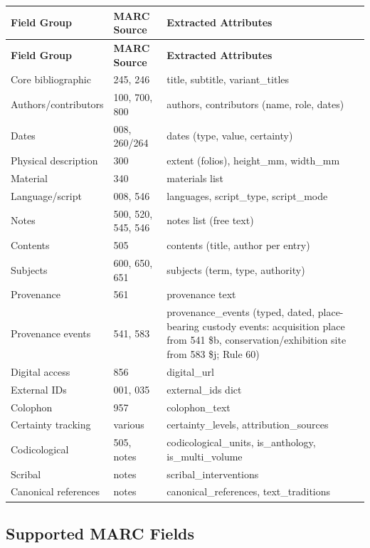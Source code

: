 \documentclass[12pt]{article}
\begin{document}
\begin{longtable}{|l|l|p{7cm}|}
\hline
\textbf{Field Group} & \textbf{MARC Source} & \textbf{Extracted Attributes} \\
\hline
\endfirsthead
\hline
\textbf{Field Group} & \textbf{MARC Source} & \textbf{Extracted Attributes} \\
\hline
\endhead
\hline
\endfoot
Core bibliographic & 245, 246 & title, subtitle, variant\_titles \\
\hline
Authors/contributors & 100, 700, 800 & authors, contributors (name, role, dates) \\
\hline
Dates & 008, 260/264 & dates (type, value, certainty) \\
\hline
Physical description & 300 & extent (folios), height\_mm, width\_mm \\
\hline
Material & 340 & materials list \\
\hline
Language/script & 008, 546 & languages, script\_type, script\_mode \\
\hline
Notes & 500, 520, 545, 546 & notes list (free text) \\
\hline
Contents & 505 & contents (title, author per entry) \\
\hline
Subjects & 600, 650, 651 & subjects (term, type, authority) \\
\hline
Provenance & 561 & provenance text \\
\hline
Provenance events & 541, 583 & provenance\_events (typed, dated, place-bearing custody events: acquisition place from 541 \$b, conservation/exhibition site from 583 \$j; Rule 60) \\
\hline
Digital access & 856 & digital\_url \\
\hline
External IDs & 001, 035 & external\_ids dict \\
\hline
Colophon & 957 & colophon\_text \\
\hline
Certainty tracking & various & certainty\_levels, attribution\_sources \\
\hline
Codicological & 505, notes & codicological\_units, is\_anthology, is\_multi\_volume \\
\hline
Scribal & notes & scribal\_interventions \\
\hline
Canonical references & notes & canonical\_references, text\_traditions \\
\hline
\end{longtable}

\subsection{Supported MARC Fields}
\end{document}
